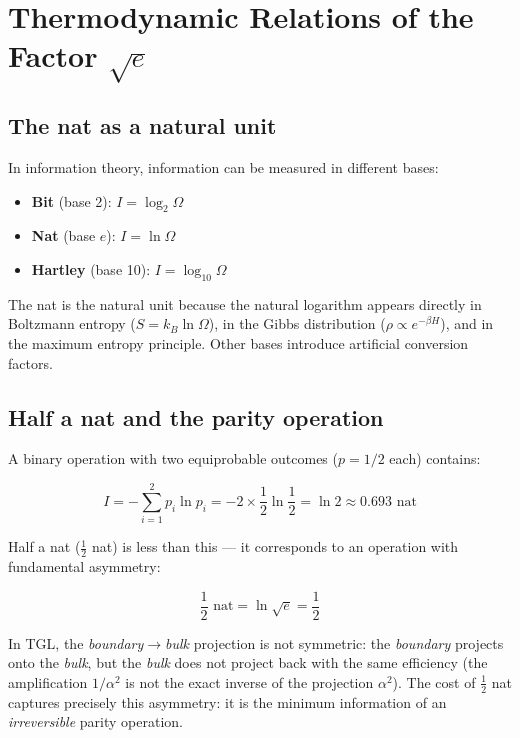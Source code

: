 \documentclass[12pt,a4paper,twoside]{article}
\newcommand{\alphaii}{\alpha^{2}}
\newcommand{\boundary}{\textit{boundary}}
\newcommand{\bulk}{\textit{bulk}}
\begin{document}
\section{Thermodynamic Relations of the Factor $\sqrt{e}$}
\label{app:termodinamica}

\subsection{The nat as a natural unit}

In information theory, information can be measured in different bases:

\begin{itemize}[nosep]
\item \textbf{Bit} (base 2): $I = \log_2 \Omega$
\item \textbf{Nat} (base $e$): $I = \ln \Omega$
\item \textbf{Hartley} (base 10): $I = \log_{10} \Omega$
\end{itemize}

The nat is the natural unit because the natural logarithm appears directly in Boltzmann entropy ($S = k_B \ln \Omega$), in the Gibbs distribution ($\rho \propto e^{-\beta H}$), and in the maximum entropy principle. Other bases introduce artificial conversion factors.

\subsection{Half a nat and the parity operation}

A binary operation with two equiprobable outcomes ($p = 1/2$ each) contains:

\begin{equation}
I = -\sum_{i=1}^{2} p_i \ln p_i = -2 \times \frac{1}{2} \ln \frac{1}{2} = \ln 2 \approx 0.693 \text{ nat}
\end{equation}

Half a nat ($\frac{1}{2}$ nat) is less than this --- it corresponds to an operation with fundamental asymmetry:

\begin{equation}
\frac{1}{2} \text{ nat} = \ln \sqrt{e} = \frac{1}{2}
\end{equation}

In TGL, the \boundary$\to$\bulk{} projection is not symmetric: the \boundary{} projects onto the \bulk{}, but the \bulk{} does not project back with the same efficiency (the amplification $1/\alphaii$ is not the exact inverse of the projection $\alphaii$). The cost of $\frac{1}{2}$ nat captures precisely this asymmetry: it is the minimum information of an \textit{irreversible} parity operation.
\end{document}
